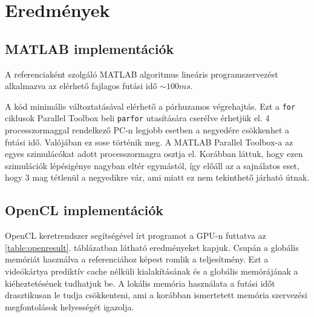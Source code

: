  \section{Eredmények}
 	
	\subsection{MATLAB implementációk}
	A referenciaként szolgáló MATLAB algoritmus lineáris programszervezést
	alkalmazva az elérhető fajlagos futási idő $\sim100 ms$.
	
	A kód minimális változtatásával elérhető a párhuzamos végrehajtás. Ezt a
	\texttt{for} ciklusok Parallel Toolbox beli \texttt{parfor} utasítására
	cserélve érhetjük el. 4 processzormaggal rendelkező PC-n  legjobb esetben a negyedére csökkenhet a
	futási idő. Valójában ez sose történik meg.
	A MATLAB Parallel Toolbox-a az egyes szimulácókat adott processzormagra osztja el.
	Korábban láttuk, hogy ezen szimulációk lépésigénye nagyban eltér egymástól, így előáll az a
	sajnálatos eset, hogy 3 mag tétlenül a negyedikre vár, ami miatt ez nem tekinthető járható útnak. 
	
	\subsection{OpenCL implementációk}
	OpenCL keretrendszer segítségével írt programot a GPU-n futtatva az
	\ref{table:openresult}. táblázatban látható eredményeket kapjuk.
	Csupán a globális memóriát használva a referenciához képest romlik a
	teljesítmény. Ezt a videókártya prediktív cache nélküli kialakításának és a
	globális memórájának a kiéheztetésének tudhatjuk be.
	A lokális memória használata a futási időt drasztikusan le tudja
	csökkenteni, ami a korábban ismertetett memória szervezési megfontolások
	helyességét igazolja.
	
	
	
	
	
